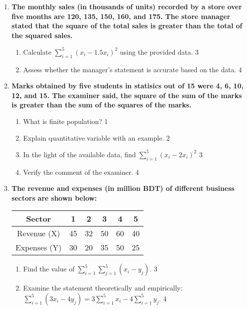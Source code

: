 \documentclass[a4paper,oneside]{book}
\begin{document}
\begin{enumerate}
  
  \item
\textbf{The monthly sales (in thousands of units) recorded by a store over 
five months are 120, 135, 150, 160, and 175. The store manager 
stated that the square of the total sales is greater than the total of 
the squared sales.}

\begin{enumerate}
    \item  
    Calculate $\displaystyle \sum_{i=1}^5 (x_i - 1.5x_i)^2$ using the 
    provided data. \hfill 3
    \item
    Assess whether the manager’s statement is accurate based on the data. \hfill 4
\end{enumerate}




 \item
	  \textbf{Marks obtained by five students in statisics out of 15 were 4, 6, 10, 12, and 15. The examiner said, the square of the sum of the marks is greater than the sum of the squares of the marks.} 
  
  \begin{enumerate}
    \item
	What is finite population? \hfill 1
    \item
	Explain quantitative variable with an example. \hfill 2
    \item  
	In the light of the available data, find $\displaystyle \sum_{i=1}^5 (x_i-2x_i)^2$ \hfill 3
    \item
	Verify the comment of the examiner. \hfill 4
  \end{enumerate}
  
  \item
\textbf{The revenue and expenses (in million BDT) of different business sectors are shown below:}

\begin{table}[h]
\centering
\begin{tabular}{c|ccccc}
Sector & 1 & 2 & 3 & 4 & 5 \\ \hline
Revenue (X) & 45 & 32 & 50 & 60 & 40 \\ \hline
Expenses (Y) & 30 & 20 & 35 & 50 & 25
\end{tabular}
\end{table}

\begin{enumerate}
    \item  
    Find the value of $\displaystyle \sum_{i=1}^5 \sum_{j=1}^5 (x_i - y_j)$. \hfill 3
    \item
    Examine the statement theoretically and empirically:  $\displaystyle \sum_{i=1}^5 (3x_i - 4y_j) = 3 \sum_{i=1}^5 x_i - 4 \sum_{i=1}^5 y_j$. \hfill 4
\end{enumerate}



\end{enumerate}
\end{document}
